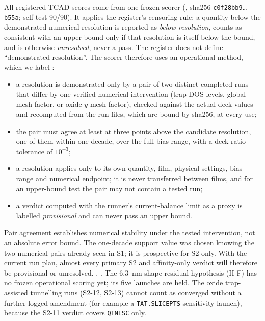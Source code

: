 All registered TCAD scores come from one frozen scorer (, sha256 \texttt{c0f28bb9}\ldots
\texttt{b55a}; self-test 90/90). %
It applies the register's censoring rule: a quantity below the demonstrated numerical resolution is reported as
\emph{below resolution}, counts as consistent with an upper bound only if that resolution is itself below the bound, and
is otherwise \emph{unresolved}, never a pass. %
The register does not define ``demonstrated resolution''. The scorer therefore uses an operational method, which we
label :
\begin{itemize}
\item a resolution is demonstrated only by a pair of two distinct completed runs that differ by one verified numerical
intervention (trap-DOS levels, global mesh factor, or oxide $y$-mesh factor), checked against the actual deck values
and recomputed from the run files, which are bound by sha256, at every use; %
\item the pair must agree at least at three points above the candidate resolution, one of them within one decade, over
the full bias range, with a deck-ratio tolerance of $10^{-3}$; %
\item a resolution applies only to its own quantity, film, physical settings, bias range and numerical endpoint; it is
never transferred between films, and for an upper-bound test the pair may not contain a tested run; %
\item a verdict computed with the runner's current-balance limit as a proxy is labelled \emph{provisional} and can
never pass an upper bound. %
\end{itemize}
Pair agreement establishes numerical stability under the tested intervention, not an absolute error bound. The
one-decade support value was chosen knowing the two numerical pairs already seen in S1; it is prospective for S2 only. %
With the current run plan, almost every primary S2 and affinity-only verdict will therefore be provisional or
unresolved. %
. %
. %
The \SI{6.3}{nm} shape-residual hypothesis (H-F) has no frozen operational scoring yet; its five launches are held. %
The oxide trap-assisted tunnelling runs (S2-12, S2-13) cannot count as converged without a further logged amendment
(for example a \texttt{TAT.SLICEPTS} sensitivity launch), because the S2-11 verdict covers \texttt{QTNLSC} only. %

